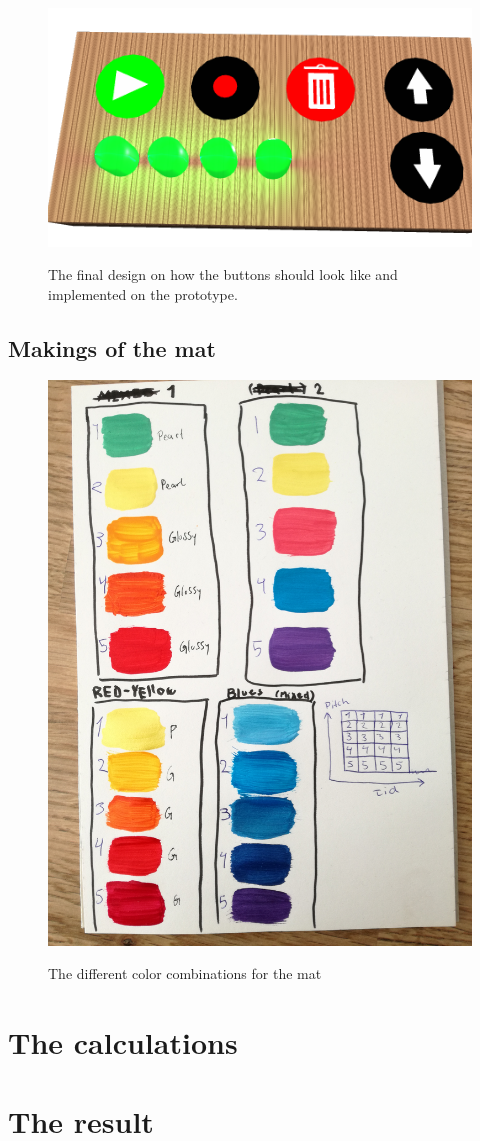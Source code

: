 \begin{figure}[H]
	\centering
	\includegraphics[width=0.7\linewidth]{figure/Design/buttonDesign}
	\label{fig:buttonDesign}
	\caption{The final design on how the buttons should look like and implemented on the prototype.}
	
\end{figure}


\subsection{Makings of the mat}

\begin{figure}[H]
	\centering
	\includegraphics[width=0.5\linewidth]{figure/Design/colors}
	\label{fig:colors}
	\caption{The different color combinations for the mat}
	
\end{figure}

\section{The calculations}

\section{The result}


